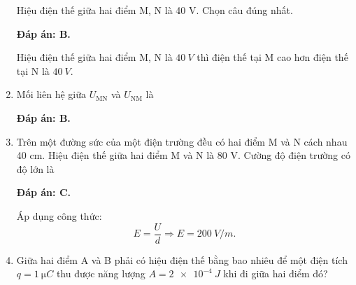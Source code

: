 \begin{enumerate}[label=\bfseries Câu \arabic*:]
	\cauhoi
	{Hiệu điện thế giữa hai điểm M, N là 40 V. Chọn câu đúng nhất.
		
	}
	\loigiai
	{	\textbf{Đáp án: B.}
		
		Hiệu điện thế giữa hai điểm M, N là $\SI{40}{V}$ thì điện thế tại M cao hơn điện thế tại N là $\SI{40}{V}$.
	}
	\item {}
	
	\cauhoi
	{Mối liên hệ giữa $U_\text{MN}$ và $U_\text{NM}$ là
		
	}
	\loigiai
	{	\textbf{Đáp án: B.}
	
	}
	\item {}
	
	\cauhoi
	{Trên một đường sức của một điện trường đều có hai điểm M và N cách nhau 40 cm. Hiệu điện thế giữa hai điểm M và N là 80 V. Cường độ điện trường có độ lớn là
		
	}
	\loigiai
	{	\textbf{Đáp án: C.}
		
		Áp dụng công thức:
		$$E=\dfrac{U}{d} \Rightarrow E = \SI{200}{V/m}.$$
	}
	\item {}
	
	\cauhoi
	{Giữa hai điểm A và B phải có hiệu điện thế bằng bao nhiêu để một điện tích $q=\SI{1}{\micro C}$ thu được năng lượng $A=\SI{2e-4}{J}$ khi đi giữa hai điểm đó?
		
}
\end{enumerate}
